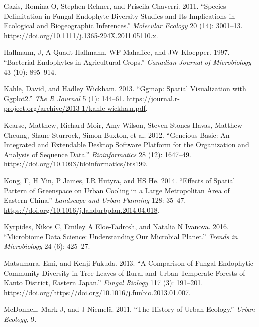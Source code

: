 \documentclass[fleqn,10pt,lineno]{wlpeerj} %
\newlength{\cslhangindent}
\newenvironment{CSLReferences}[2] %
 {%
  \setlength{\parindent}{0pt}
  \ifodd #1 \everypar{\setlength{\hangindent}{\cslhangindent}}\ignorespaces\fi
  \ifnum #2 > 0
  \setlength{\parskip}{#2\baselineskip}
  \fi
 }%
 {}
\begin{document}
\begin{CSLReferences}{1}{0}
\leavevmode{}%
Gazis, Romina O, Stephen Rehner, and Priscila Chaverri. 2011. {``Species Delimitation in Fungal Endophyte Diversity Studies and Its Implications in Ecological and Biogeographic Inferences.''} \emph{Molecular Ecology} 20 (14): 3001--13. \url{https://doi.org/10.1111/j.1365-294X.2011.05110.x}.

\leavevmode{}%
Hallmann, J, A Quadt-Hallmann, WF Mahaffee, and JW Kloepper. 1997. {``Bacterial Endophytes in Agricultural Crops.''} \emph{Canadian Journal of Microbiology} 43 (10): 895--914.

\leavevmode{}%
Kahle, David, and Hadley Wickham. 2013. {``Ggmap: Spatial Visualization with Ggplot2.''} \emph{The R Journal} 5 (1): 144--61. \url{https://journal.r-project.org/archive/2013-1/kahle-wickham.pdf}.

\leavevmode{}%
Kearse, Matthew, Richard Moir, Amy Wilson, Steven Stones-Havas, Matthew Cheung, Shane Sturrock, Simon Buxton, et al. 2012. {``Geneious Basic: An Integrated and Extendable Desktop Software Platform for the Organization and Analysis of Sequence Data.''} \emph{Bioinformatics} 28 (12): 1647--49. \url{https://doi.org/10.1093/bioinformatics/bts199}.

\leavevmode{}%
Kong, F, H Yin, P James, LR Hutyra, and HS He. 2014. {``Effects of Spatial Pattern of Greenspace on Urban Cooling in a Large Metropolitan Area of Eastern China.''} \emph{Landscape and Urban Planning} 128: 35--47. \url{https://doi.org/10.1016/j.landurbplan.2014.04.018}.

\leavevmode{}%
Kyrpides, Nikos C, Emiley A Eloe-Fadrosh, and Natalia N Ivanova. 2016. {``Microbiome Data Science: Understanding Our Microbial Planet.''} \emph{Trends in Microbiology} 24 (6): 425--27.

\leavevmode{}%
Matsumura, Emi, and Kenji Fukuda. 2013. {``A Comparison of Fungal Endophytic Community Diversity in Tree Leaves of Rural and Urban Temperate Forests of Kanto District, Eastern Japan.''} \emph{Fungal Biology} 117 (3): 191--201. https://doi.org/\url{https://doi.org/10.1016/j.funbio.2013.01.007}.

\leavevmode{}%
McDonnell, Mark J, and J Niemelä. 2011. {``The History of Urban Ecology.''} \emph{Urban Ecology}, 9.


\end{CSLReferences}
\end{document}
